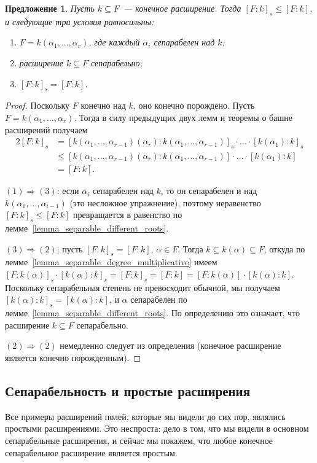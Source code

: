 \documentclass[a4paper,11pt]{scrartcl}
\theoremstyle{plain}
\newtheorem{proposition}[theorem]{Предложение}
\theoremstyle{definition}
\newcommand\sseq{\subseteq}
\begin{document}
\begin{proposition}
Пусть $k\sseq F$~--- конечное расширение. Тогда $[F:k]_s\leq[F:k]$, и
следующие три условия равносильны:
\begin{enumerate}
\item $F=k(\alpha_1,\dots,\alpha_r)$, где каждый $\alpha_i$
сепарабелен над $k$;
\item расширение $k\sseq F$ сепарабельно;
\item $[F:k]_s=[F:k]$.
\end{enumerate}
\end{proposition}
\begin{proof}
Поскольку $F$ конечно над $k$, оно конечно порождено. Пусть
$F=k(\alpha_1,\dots,\alpha_r)$. Тогда в силу предыдущих двух лемм и
теоремы о
башне расширений получаем
\begin{alignat*}{2}
[F:k]_s&=[k(\alpha_1,\dots,\alpha_{r-1})(\alpha_r) :
k(\alpha_1,\dots,\alpha_{r-1})]_s\cdot\dots\cdot
[k(\alpha_1):k]_s\\
&\leq[k(\alpha_1,\dots,\alpha_{r-1})(\alpha_r):
k(\alpha_1,\dots,\alpha_{r-1})]\cdot\dots\cdot [k(\alpha_1):k]\\
&=[F:k].
\end{alignat*}

$(1)\Longrightarrow(3)$: если $\alpha_i$ сепарабелен над $k$, то он
сепарабелен и над $k(\alpha_1,\dots,\alpha_{i-1})$ (это несложное
упражнение),
поэтому неравенство $[F:k]_s\leq[F:k]$ превращается в равенство по
лемме~\ref{lemma_separable_different_roots}.

$(3)\Longrightarrow(2)$: пусть $[F:k]_s=[F:k]$, $\alpha\in F$. Тогда
$k\sseq k(\alpha)\sseq F$, откуда по
лемме~\ref{lemma_separable_degree_multiplicative} имеем
$[F:k(\alpha)]_s\cdot [k(\alpha):k]_s = [F:k]_s = [F:k] =
[F:k(\alpha)]\cdot [k(\alpha):k]$.
Поскольку сепарабельная степень не превосходит обычной, мы
получаем $[k(\alpha):k]_s=[k(\alpha):k]$, и $\alpha$ сепарабелен по
лемме~\ref{lemma_separable_different_roots}. По определению это
означает, что расширение $k\sseq F$ сепарабельно.

$(2)\Longrightarrow(2)$ немедленно следует из определения (конечное
расширение является конечно порожденным).
\end{proof}

\subsection{Сепарабельность и простые расширения}

Все примеры расширений полей, которые мы видели до сих пор, являлись
простыми расширениями. Это неспроста: дело в том, что мы видели в
основном сепарабельные расширения, и сейчас мы покажем, что любое
конечное сепарабельное расширение является простым.
\end{document}
